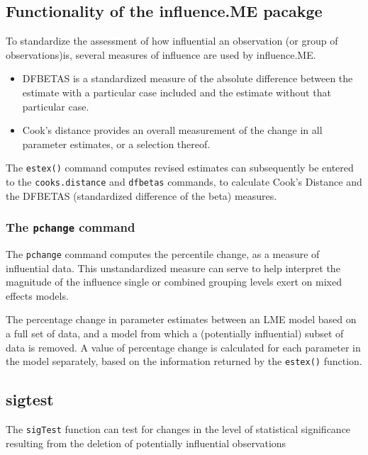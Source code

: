 \subsection*{Functionality of the influence.ME pacakge}
To standardize the assessment of how influential an observation (or group of observations)is, several measures
of influence are used by influence.ME.


\begin{itemize}
	\item DFBETAS is a standardized measure of the absolute difference
	between the estimate with a particular case included and the estimate without that particular
	case. 
	\item Cook’s distance provides an overall measurement of the change in all parameter
	estimates, or a selection thereof.
\end{itemize}

The \texttt{estex()} command computes revised estimates can subsequently
be entered to the \texttt{cooks.distance} and \texttt{dfbetas} commands, to calculate Cook’s Distance
and the DFBETAS (standardized difference of the beta) measures.
\subsubsection*{The \texttt{pchange} command}

The \texttt{pchange} command computes the percentile change, as a measure of influential data. This unstandardized measure can
serve to help interpret the magnitude of the influence single or combined grouping levels exert on
mixed effects models. 

The percentage change in parameter estimates between an LME model based on a full set of data, and a model from which a (potentially influential)
subset of data is removed. A value of percentage change is calculated for each parameter in the
model separately, based on the information returned by the \texttt{estex()} function.

\subsection*{sigtest}

The \texttt{sigTest} function can test for changes in the level of statistical significance resulting from
the deletion of potentially influential observations

